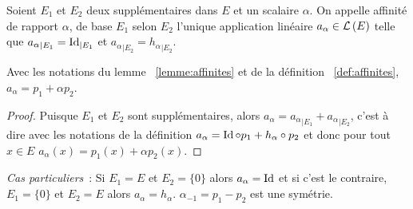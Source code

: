 %
\begin{defdef}\label{def:affinites}
  Soient \(E_1\) et \(E_2\) deux supplémentaires dans \(E\) et un scalaire 
  \(\alpha\). On appelle affinité de rapport \(\alpha\), de base \(E_1\) selon 
  \(E_2\) l'unique application linéaire \(a_\alpha \in \mathcal{L}\left(E\right)\) telle que 
  \({a_\alpha}_{|E_1} = \operatorname{Id}_{|E_1}\) et \({a_\alpha}_{|E_2} = 
  {h_\alpha}_{|E_2}\).
\end{defdef}
%
\begin{prop}
  Avec les notations du lemme~
  \ref{lemme:affinites} et de la définition~
  \ref{def:affinites}, \(a_{\alpha}=p_1+\alpha p_2\).
\end{prop}
\begin{proof}
  Puisque \(E_1\) et \(E_2\) sont supplémentaires, alors \(a_\alpha= 
  {a_\alpha}_{|E_1} + {a_\alpha}_{|E_2}\), c'est à dire avec les notations de la 
  définition \(a_\alpha= \operatorname{Id} \circ p_1 + h_\alpha \circ p_2\) et donc pour tout 
  \(x \in E\) \(a_\alpha(x)=p_1(x)+\alpha p_2(x)\).
\end{proof}

\emph{Cas particuliers}~: Si \(E_1=E\) et \(E_2=\{0\}\) alors \(a_\alpha=\operatorname{Id}\) 
et si c'est le contraire, \(E_1=\{0\}\) et \(E_2=E\) alors 
\(a_\alpha=h_\alpha\). \(\alpha_{-1}=p_1-p_2\) est une symétrie.


